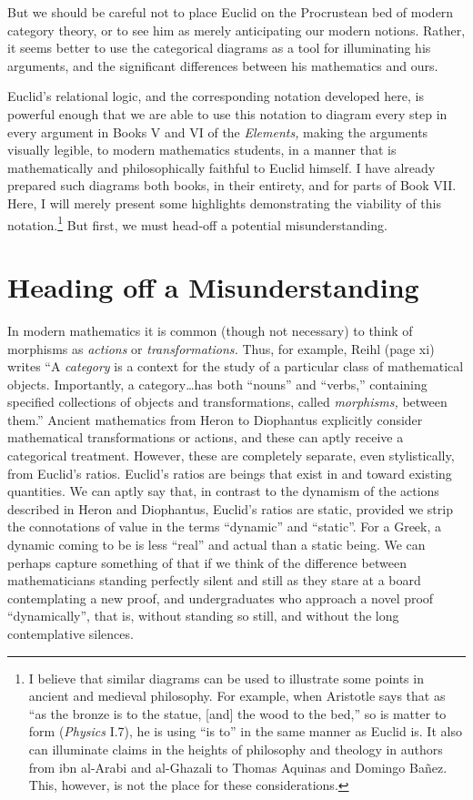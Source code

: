 \documentclass[11pt]{article}
\begin{document}
But we should be careful not to place Euclid on the Procrustean bed of modern category theory, or to see him as merely anticipating our modern notions. Rather, it seems better to use the categorical diagrams as a tool for illuminating his arguments, and the significant differences between his mathematics and ours.

Euclid's relational logic, and the corresponding notation developed here, is powerful enough that we are able to use this notation to diagram every step in every argument in Books V and VI of the \textit{Elements,} making the arguments visually legible, to modern mathematics students, in a manner that is mathematically and philosophically faithful to Euclid himself. I have already prepared such diagrams both books, in their entirety, and for parts of Book VII. Here, I will merely present some highlights demonstrating the viability of this notation.\footnote{I believe that similar diagrams can be used to illustrate some points in ancient and medieval philosophy. For example, when Aristotle \citep{aristotle-physics} says that as ``as the bronze is to the statue, [and] the wood to the bed,'' so is matter to form (\textit{Physics} I.7), he is using ``is to'' in the same manner as Euclid is. It also can illuminate claims in the heights of philosophy and theology in authors from ibn al-Arabi and al-Ghazali to Thomas Aquinas and Domingo Ba\~nez. This, however, is not the place for these considerations.} But first, we must head-off a potential misunderstanding.

\section{Heading off a Misunderstanding}

In modern mathematics it is common (though not necessary) to think of morphisms as \textit{actions} or \textit{transformations.} Thus, for example, Reihl \citep{riehl2017} (page xi) writes ``A \textit{category} is a context for the study of a particular class of mathematical objects. Importantly, a category\ldots has both ``nouns'' and ``verbs,'' containing specified collections of objects and transformations, called \textit{morphisms,} between them.'' Ancient mathematics from Heron to Diophantus explicitly consider mathematical transformations or actions, and these can aptly receive a categorical treatment. However, these are completely separate, even stylistically, from Euclid's ratios. Euclid's ratios are beings that exist in and toward existing quantities. We can aptly say that, in contrast to the dynamism of the actions described in Heron and Diophantus, Euclid's ratios are static, provided we strip the connotations of value in the terms ``dynamic'' and ``static''. For a Greek, a dynamic coming to be is less ``real'' and actual than a static being. We can perhaps capture something of that if we think of the difference between mathematicians standing perfectly silent and still as they stare at a board contemplating a new proof, and undergraduates who approach a novel proof ``dynamically'', that is, without standing so still, and without the long contemplative silences.
\end{document}
